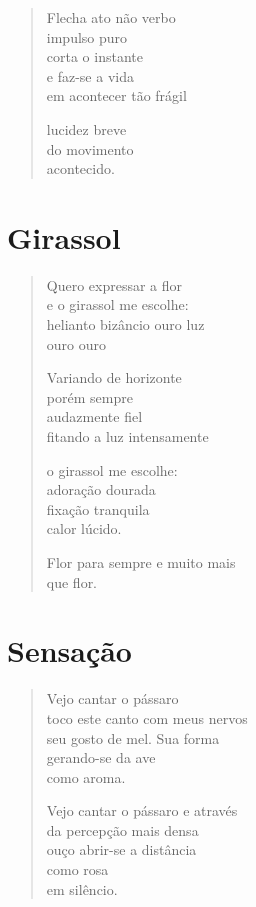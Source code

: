 \begin{verse}
Flecha ato não verbo\\
impulso puro\\
corta o instante\\
e faz-se a vida\\
em acontecer tão frágil

lucidez breve\\
do movimento\\
acontecido.
\end{verse}

\chapter{Girassol}

\begin{verse}
Quero expressar a flor\\
e o girassol me escolhe:\\
helianto bizâncio ouro luz\\
\qquad\qquad\qquad\quad ouro ouro

Variando de horizonte\\
porém sempre\\
audazmente fiel\\
fitando a luz intensamente

o girassol me escolhe:\\
adoração dourada\\
fixação tranquila\\
calor lúcido.

Flor para sempre e muito mais\\
que flor.
\end{verse}

\chapter{Sensação}

\begin{verse}
Vejo cantar o pássaro\\
toco este canto com meus nervos\\
seu gosto de mel. Sua forma\\
gerando-se da ave\\
como aroma.

Vejo cantar o pássaro e através\\
da percepção mais densa\\
ouço abrir-se a distância\\
como rosa\\
em silêncio.
\end{verse}

